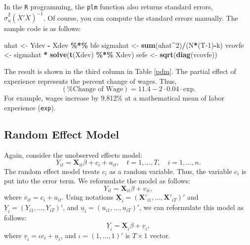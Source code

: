 \documentclass[
  12pt,
]{article}
\newenvironment{Shaded}{\begin{snugshade}}{\end{snugshade}}
\newcommand{\DecValTok}[1]{\textcolor[rgb]{0.00,0.00,0.81}{#1}}
\newcommand{\KeywordTok}[1]{\textcolor[rgb]{0.13,0.29,0.53}{\textbf{#1}}}
\newcommand{\NormalTok}[1]{#1}
\newcommand{\OperatorTok}[1]{\textcolor[rgb]{0.81,0.36,0.00}{\textbf{#1}}}
\newcommand{\StringTok}[1]{\textcolor[rgb]{0.31,0.60,0.02}{#1}}
\begin{document}
In the \texttt{R} programming, the \texttt{plm} function also returns
standard errors, \(\hat{\sigma}_u^2 (\ddot{X}' \ddot{X})^{-1}\). Of
course, you can compute the standard errors manually. The sample code is
as follows:

\begin{Shaded}
\begin{Highlighting}[]
\NormalTok{uhat \textless{}{-}}\StringTok{ }\NormalTok{Ydev }\OperatorTok{{-}}\StringTok{ }\NormalTok{Xdev }\OperatorTok{\%*\%}\StringTok{ }\NormalTok{bfe}
\NormalTok{sigmahat \textless{}{-}}\StringTok{ }\KeywordTok{sum}\NormalTok{(uhat}\OperatorTok{\^{}}\DecValTok{2}\NormalTok{)}\OperatorTok{/}\NormalTok{(N}\OperatorTok{*}\NormalTok{(T}\DecValTok{{-}1}\NormalTok{)}\OperatorTok{{-}}\NormalTok{k)}
\NormalTok{vcovfe \textless{}{-}}\StringTok{ }\NormalTok{sigmahat }\OperatorTok{*}\StringTok{ }\KeywordTok{solve}\NormalTok{(}\KeywordTok{t}\NormalTok{(Xdev) }\OperatorTok{\%*\%}\StringTok{ }\NormalTok{Xdev)}
\NormalTok{sefe \textless{}{-}}\StringTok{ }\KeywordTok{sqrt}\NormalTok{(}\KeywordTok{diag}\NormalTok{(vcovfe))}
\end{Highlighting}
\end{Shaded}

The result is shown in the third column in Table \ref{pdm}. The partial
effect of experience represents the percent change of wages. Thus, \[
  (\text{\% Change of Wage}) = 11.4 - 2 \cdot 0.04 \cdot \text{exp}.
\] For example, wages increase by 9.812\% at a mathematical mean of
labor experience (\texttt{exp}).

\hypertarget{random-effect-model}{%
\subsection{Random Effect Model}\label{random-effect-model}}

Again, consider the unobserved effects model: \[
  Y_{it} = \mathbf{X}_{it} \beta + c_i + u_{it}, \quad t = 1, \ldots, T, \quad i = 1, \ldots, n.
\] The random effect model treats \(c_i\) as a random variable. Thus,
the variable \(c_i\) is put into the error term. We reformulate the
model as follows: \[
  Y_{it} = \mathbf{X}_{it} \beta + v_{it},
\] where \(v_{it} = c_i + u_{it}\). Using notations
\(\underline{\mathbf{X}}_i = (\mathbf{X}'_{i1}, \ldots, \mathbf{X}'_{iT})'\)
and \(\underline{Y}_i = (Y_{i1}, \ldots, Y_{iT})'\), and
\(\underline{u}_i = (u_{i1}, \ldots, u_{iT})'\), we can reformulate this
model as follows: \[
  \underline{Y}_i = \underline{\mathbf{X}}_i \beta + \underline{v}_i,
\] where \(\underline{v}_i = \iota c_i + \underline{u}_i\), and
\(\iota = (1, \ldots, 1)'\) is \(T \times 1\) vector.
\end{document}
